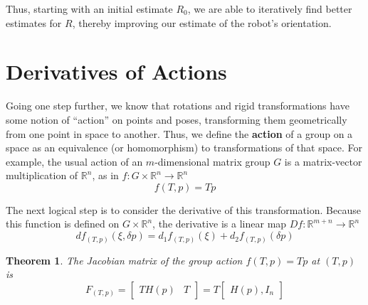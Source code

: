 \documentclass[reqno]{amsart}
\newtheorem{thm}{Theorem}[section]
\theoremstyle{definition}
\numberwithin{equation}{section}
\begin{document}
Thus, starting with an initial estimate $R_0$, we are able to iteratively find better estimates for $R$, thereby improving our estimate of the robot's orientation. 

\section{Derivatives of Actions}

Going one step further, we know that rotations and rigid transformations have some notion of ``action'' on points and poses, transforming them geometrically from one point in space to another. Thus, we define the \textbf{action} of a group on a space as an equivalence (or homomorphism) to transformations of that space. For example, the usual action of an $m$-dimensional matrix group $G$ is a matrix-vector multiplication of $\mathbb{R}^n$, as in $f : G \times \mathbb{R}^n \to \mathbb{R}^n$
\begin{equation*}
    f(T, p) = Tp
\end{equation*}

The next logical step is to consider the derivative of this transformation. Because this function is defined on $G \times \mathbb{R}^n$, the derivative is a linear map $Df: \mathbb{R}^{m + n} \to \mathbb{R}^n$
\begin{equation*}
    df_{(T, p)}(\xi, \delta{p}) = d_1f_{(T, p)}(\xi) + d_2f_{(T, p)}(\delta{p})
\end{equation*}

\begin{thm}
    The Jacobian matrix of the group action $f(T, p) = Tp$ at $(T, p)$ is
    \begin{equation*}
        F_{(T, p)} = \begin{bmatrix} TH(p) & T\end{bmatrix} = T\begin{bmatrix} H(p), I_n \end{bmatrix}
    \end{equation*}
\end{thm}
\end{document}
